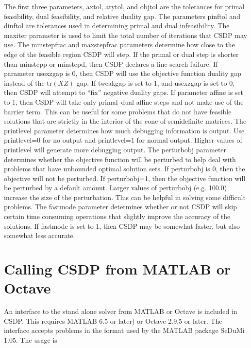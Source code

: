 \documentclass{article}
\begin{document}
The first three parameters, axtol, atytol, and objtol are the
tolerances for primal feasibility, dual feasibility, and relative
duality gap.  The parameters pinftol and dinftol are tolerances used
in determining primal and dual infeasibility.  The maxiter parameter
is used to limit the total number of iterations that CSDP may use.
The minstepfrac and maxstepfrac parameters determine how close to the
edge of the feasible region CSDP will step.  If the primal or dual
step is shorter than minstepp or minstepd, then CSDP declares a line
search failure.  If parameter usexzgap is 0, then CSDP will use the
objective function duality gap instead of the   
$\mbox{tr}(XZ)$ gap.
If tweakgap is
set to 1, and usexzgap is set to 0, then CSDP will attempt to ``fix'' negative duality gaps.
If parameter affine is set to 1, then CSDP will take only primal--dual
affine steps and not make use of the barrier term.  This can be useful
for some problems that do not have feasible solutions that are strictly in the
interior of the cone of semidefinite matrices.
The printlevel parameter determines how much debugging information is
output.  Use printlevel=0 for no output and printlevel=1 for normal
output. Higher values of printlevel will generate more debugging
output.  The perturbobj parameter determines whether the objective
function will be perturbed to help deal with problems that have unbounded
optimal solution sets.  If perturbobj is 0, then the objective will not
be perturbed.  If perturbobj=1, then the objective function will be perturbed
by a default amount.  Larger values of perturbobj (e.g. 100.0) increase the
size of the perturbation.  This can be helpful in solving some difficult
problems. The fastmode parameter determines whether or not
CSDP will skip certain time consuming operations that slightly improve
the accuracy of the solutions.  If fastmode is set to
1, then CSDP may be somewhat faster, but also somewhat less accurate.   
  
\section*{Calling CSDP from MATLAB or Octave}
An interface to the stand alone solver from MATLAB or Octave is
included in CSDP.  This requires MATLAB 6.5 or later) or Octave 2.9.5
or later.  The interface accepts problems in the format used by the
MATLAB package SeDuMi 1.05.  The usage is
\end{document}

